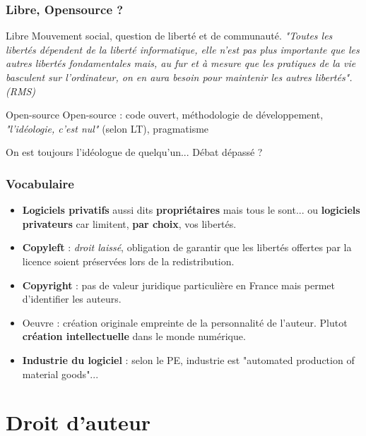\documentclass{beamer}
\begin{document}
\begin{frame}\frametitle{Libre, Opensource ?}

  \begin{block}{Libre}
    Mouvement social, question de liberté et de
    communauté. \textit{"Toutes les libertés dépendent de la liberté
      informatique, elle n’est pas plus importante que les autres
      libertés fondamentales mais, au fur et à mesure que les
      pratiques de la vie basculent sur l’ordinateur, on en aura
      besoin pour maintenir les autres libertés". (RMS)}
  \end{block}

  \begin{block}{Open-source}
    Open-source : code ouvert, méthodologie de développement,
    \textit{"l'idéologie, c'est nul"} (selon LT), pragmatisme
  \end{block}

On est toujours l'idéologue de quelqu'un... Débat dépassé ?
\end{frame}

\begin{frame}\frametitle{Vocabulaire}

  \begin{itemize}
  \item \textbf{Logiciels privatifs} aussi dits \textbf{propriétaires}
    mais tous le sont... ou \textbf{logiciels privateurs} car
    limitent, \textbf{par choix}, vos libertés.
  \item \textbf{Copyleft} : \textit{droit laissé}, obligation de
    garantir que les libertés offertes par la licence soient
    préservées lors de la redistribution.
  \item \textbf{Copyright} : pas de valeur juridique particulière en
    France mais permet d'identifier les auteurs.
  \item Oeuvre : création originale empreinte de la personnalité de
    l'auteur. Plutot \textbf{création intellectuelle} dans le monde
    numérique.
  \item \textbf{Industrie du logiciel} : selon le PE, industrie est
    "automated production of material goods"...
  \end{itemize}
\end{frame}

\section{Droit d'auteur}
\end{document}
